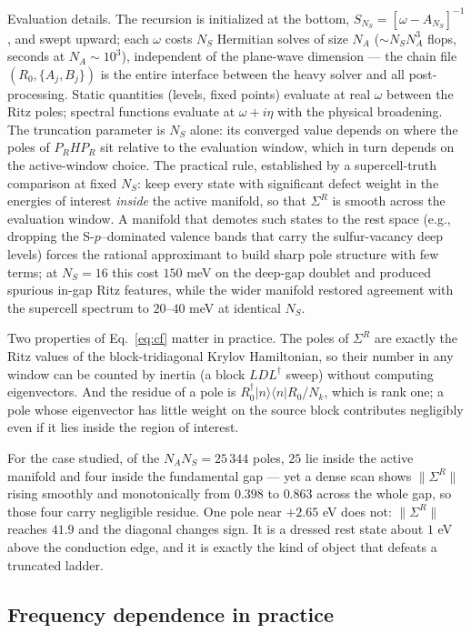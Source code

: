 \documentclass[aps,prx,reprint,superscriptaddress,nofootinbib,longbibliography]{revtex4-2}
\begin{document}
Evaluation details. The recursion is initialized at the bottom,
$S_{N_S}=[\omega-A_{N_S}]^{-1}$, and swept upward; each $\omega$ costs
$N_S$ Hermitian solves of size $N_A$ ($\sim N_S N_A^3$ flops, seconds at
$N_A\sim10^3$), independent of the plane-wave dimension --- the chain file
$(R_0,\{A_j,B_j\})$ is the entire interface between the heavy solver and all
post-processing. Static quantities (levels, fixed points) evaluate at real
$\omega$ between the Ritz poles; spectral functions evaluate at
$\omega+i\eta$ with the physical broadening. The truncation parameter is
$N_S$ alone: its converged value depends on where the poles of
$P_RHP_R$ sit relative to the evaluation window, which in turn depends on
the active-window choice. The practical rule, established by a
supercell-truth comparison at fixed $N_S$: keep every state with
significant defect weight in the energies of interest \emph{inside} the
active manifold, so that $\Sigma^R$ is smooth across the evaluation window.
A manifold that demotes such states to the rest space (e.g., dropping the
S-$p$--dominated valence bands that carry the sulfur-vacancy deep levels)
forces the rational approximant to build sharp pole structure with few
terms; at $N_S=16$ this cost $150$ meV on the deep-gap doublet and produced
spurious in-gap Ritz features, while the wider manifold restored agreement
with the supercell spectrum to $20$--$40$ meV at identical $N_S$.

Two properties of Eq.~\eqref{eq:cf} matter in practice. The poles of
$\Sigma^R$ are exactly the Ritz values of the block-tridiagonal Krylov
Hamiltonian, so their number in any window can be counted by inertia (a block
$LDL^{\dagger}$ sweep) without computing eigenvectors. And the residue of a
pole is $R_0^{\dagger}|n\rangle\langle n|R_0/N_k$, which is rank one; a pole
whose eigenvector has little weight on the source block contributes negligibly
even if it lies inside the region of interest.

For the case studied, of the $N_A N_S = 25\,344$ poles, $25$ lie inside the
active manifold and four inside the fundamental gap --- yet a dense scan shows
$\lVert\Sigma^R\rVert$ rising smoothly and monotonically from $0.398$ to
$0.863$ across the whole gap, so those four carry negligible residue. One pole
near $+2.65$ eV does not: $\lVert\Sigma^R\rVert$ reaches $41.9$ and the
diagonal changes sign. It is a dressed rest state about $1$ eV above the
conduction edge, and it is exactly the kind of object that defeats a truncated
ladder.

\subsection{Frequency dependence in practice}
\end{document}
